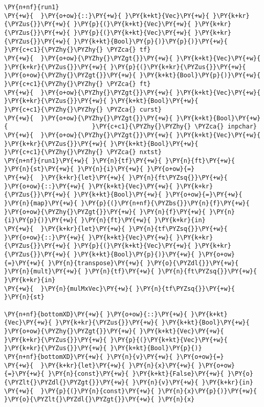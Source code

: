 {\begin{Verbatim}[commandchars=\\\{\}]
\PY{n+nf}{run1}
\PY{+w}{  }\PY{o+ow}{::}\PY{+w}{ }\PY{k+kt}{Vec}\PY{+w}{ }\PY{k+kr}{\PYZus{}}\PY{+w}{ }\PY{p}{(}\PY{k+kt}{Vec}\PY{+w}{ }\PY{k+kr}{\PYZus{}}\PY{+w}{ }\PY{p}{(}\PY{k+kt}{Vec}\PY{+w}{ }\PY{k+kr}{\PYZus{}}\PY{+w}{ }\PY{k+kt}{Bool}\PY{p}{)}\PY{p}{)}\PY{+w}{ }\PY{c+c1}{\PYZhy{}\PYZhy{} \PYZca{} tf}
\PY{+w}{  }\PY{o+ow}{\PYZhy{}\PYZgt{}}\PY{+w}{ }\PY{k+kt}{Vec}\PY{+w}{ }\PY{k+kr}{\PYZus{}}\PY{+w}{ }\PY{p}{(}\PY{k+kr}{\PYZus{}}\PY{+w}{ }\PY{o+ow}{\PYZhy{}\PYZgt{}}\PY{+w}{ }\PY{k+kt}{Bool}\PY{p}{)}\PY{+w}{          }\PY{c+c1}{\PYZhy{}\PYZhy{} \PYZca{} ft}
\PY{+w}{  }\PY{o+ow}{\PYZhy{}\PYZgt{}}\PY{+w}{ }\PY{k+kt}{Vec}\PY{+w}{ }\PY{k+kr}{\PYZus{}}\PY{+w}{ }\PY{k+kt}{Bool}\PY{+w}{                 }\PY{c+c1}{\PYZhy{}\PYZhy{} \PYZca{} curst}
\PY{+w}{  }\PY{o+ow}{\PYZhy{}\PYZgt{}}\PY{+w}{ }\PY{k+kt}{Bool}\PY{+w}{                       }\PY{c+c1}{\PYZhy{}\PYZhy{} \PYZca{} inpchar}
\PY{+w}{  }\PY{o+ow}{\PYZhy{}\PYZgt{}}\PY{+w}{ }\PY{k+kt}{Vec}\PY{+w}{ }\PY{k+kr}{\PYZus{}}\PY{+w}{ }\PY{k+kt}{Bool}\PY{+w}{                 }\PY{c+c1}{\PYZhy{}\PYZhy{} \PYZca{} nxtst}
\PY{n+nf}{run1}\PY{+w}{ }\PY{n}{tf}\PY{+w}{ }\PY{n}{ft}\PY{+w}{ }\PY{n}{st}\PY{+w}{ }\PY{n}{i}\PY{+w}{ }\PY{o+ow}{=}
\PY{+w}{  }\PY{k+kr}{let}\PY{+w}{ }\PY{n}{ft\PYZsq{}}\PY{+w}{ }\PY{o+ow}{::}\PY{+w}{ }\PY{k+kt}{Vec}\PY{+w}{ }\PY{k+kr}{\PYZus{}}\PY{+w}{ }\PY{k+kt}{Bool}\PY{+w}{ }\PY{o+ow}{=}\PY{+w}{ }\PY{n}{map}\PY{+w}{ }\PY{p}{(}\PY{n+nf}{\PYZbs{}}\PY{n}{f}\PY{+w}{ }\PY{o+ow}{\PYZhy{}\PYZgt{}}\PY{+w}{ }\PY{n}{f}\PY{+w}{ }\PY{n}{i}\PY{p}{)}\PY{+w}{ }\PY{n}{ft}\PY{+w}{ }\PY{k+kr}{in}
\PY{+w}{  }\PY{k+kr}{let}\PY{+w}{ }\PY{n}{tf\PYZsq{}}\PY{+w}{ }\PY{o+ow}{::}\PY{+w}{ }\PY{k+kt}{Vec}\PY{+w}{ }\PY{k+kr}{\PYZus{}}\PY{+w}{ }\PY{p}{(}\PY{k+kt}{Vec}\PY{+w}{ }\PY{k+kr}{\PYZus{}}\PY{+w}{ }\PY{k+kt}{Bool}\PY{p}{)}\PY{+w}{ }\PY{o+ow}{=}\PY{+w}{ }\PY{n}{transpose}\PY{+w}{ }\PY{o}{\PYZdl{}}\PY{+w}{ }\PY{n}{mult}\PY{+w}{ }\PY{n}{tf}\PY{+w}{ }\PY{n}{ft\PYZsq{}}\PY{+w}{ }\PY{k+kr}{in}
\PY{+w}{  }\PY{n}{mulMxVec}\PY{+w}{ }\PY{n}{tf\PYZsq{}}\PY{+w}{ }\PY{n}{st}

\PY{n+nf}{bottomXD}\PY{+w}{ }\PY{o+ow}{::}\PY{+w}{ }\PY{k+kt}{Vec}\PY{+w}{ }\PY{k+kr}{\PYZus{}}\PY{+w}{ }\PY{k+kt}{Bool}\PY{+w}{ }\PY{o+ow}{\PYZhy{}\PYZgt{}}\PY{+w}{ }\PY{k+kt}{Vec}\PY{+w}{ }\PY{k+kr}{\PYZus{}}\PY{+w}{ }\PY{p}{(}\PY{k+kt}{Vec}\PY{+w}{ }\PY{k+kr}{\PYZus{}}\PY{+w}{ }\PY{k+kt}{Bool}\PY{p}{)}
\PY{n+nf}{bottomXD}\PY{+w}{ }\PY{n}{v}\PY{+w}{ }\PY{o+ow}{=}
\PY{+w}{  }\PY{k+kr}{let}\PY{+w}{ }\PY{n}{x}\PY{+w}{ }\PY{o+ow}{=}\PY{+w}{ }\PY{n}{const}\PY{+w}{ }\PY{k+kt}{False}\PY{+w}{ }\PY{o}{\PYZlt{}\PYZdl{}\PYZgt{}}\PY{+w}{ }\PY{n}{v}\PY{+w}{ }\PY{k+kr}{in}
\PY{+w}{  }\PY{p}{(}\PY{n}{const}\PY{+w}{ }\PY{n}{x}\PY{p}{)}\PY{+w}{ }\PY{o}{\PYZlt{}\PYZdl{}\PYZgt{}}\PY{+w}{ }\PY{n}{x}


\end{Verbatim}}
